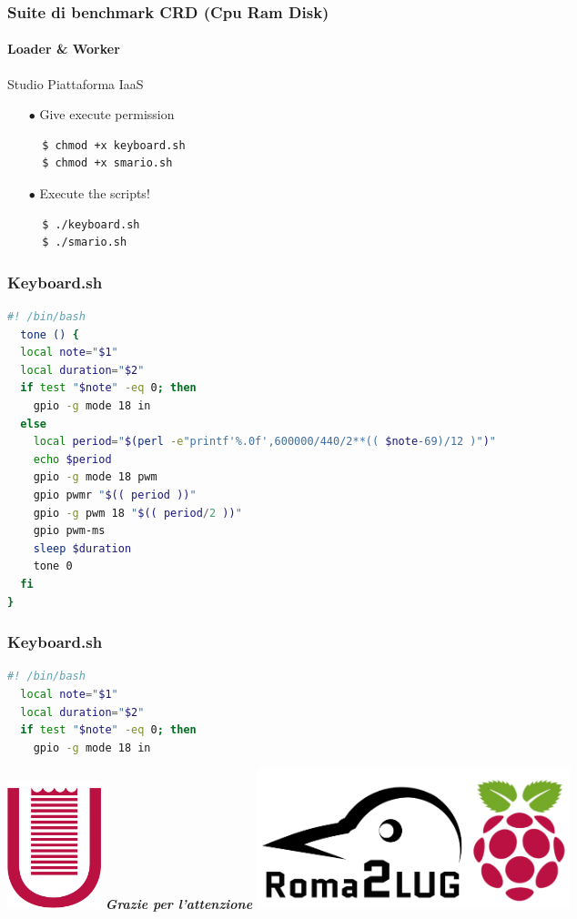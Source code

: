 \documentclass{beamer}
\begin{document}

\begin{frame}[fragile]
	\frametitle{\textbf{Suite di benchmark CRD (Cpu Ram Disk)}}
	\framesubtitle{\textbf{Loader \& Worker}}

	\begin{block}{Studio Piattaforma IaaS}
		\begin{itemize}
			\item[$\bullet$] Give execute permission
			\begin{lstlisting}
  $ chmod +x keyboard.sh
  $ chmod +x smario.sh
			\end{lstlisting}
			\item[$\bullet$] Execute the scripts!
			\begin{lstlisting}
  $ ./keyboard.sh
  $ ./smario.sh
			\end{lstlisting}
		\end{itemize}
	\end{block}
\end{frame}



\begin{frame}[fragile]
	\frametitle{\textbf{Keyboard.sh}}
			\begin{lstlisting}[language=bash]
  #! /bin/bash
  tone () {
  local note="$1"
  local duration="$2"
  if test "$note" -eq 0; then
    gpio -g mode 18 in
  else
    local period="$(perl -e"printf'%.0f',600000/440/2**(( $note-69)/12 )")"
    echo $period
    gpio -g mode 18 pwm
    gpio pwmr "$(( period ))"
    gpio -g pwm 18 "$(( period/2 ))"
    gpio pwm-ms
    sleep $duration
    tone 0
  fi
}

			\end{lstlisting}
\end{frame}



\begin{frame}[fragile]
	\frametitle{\textbf{Keyboard.sh}}
		\begin{lstlisting}[language=bash]
  #! /bin/bash
  local note="$1"
  local duration="$2"
  if test "$note" -eq 0; then
    gpio -g mode 18 in
  		\end{lstlisting}
\end{frame}



\begin{frame}[plain]
\begin{center}
\includegraphics[width=0.12\textwidth]{imgs/logo-uniroma2-red.png}
\vfill
\huge{\textit{\textbf{Grazie per l'attenzione}}}
\vfill
\includegraphics[width=0.40\textwidth]{imgs/logo02.png}
\end{center}
\end{frame}
\end{document}
